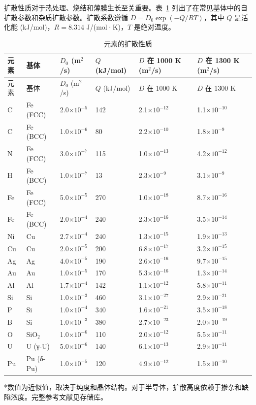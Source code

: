 \documentclass[12pt,a4paper]{article}
\begin{document}
	扩散性质对于热处理、烧结和薄膜生长至关重要。表~\ref{tab:diffusion-properties-func} 列出了在常见基体中的自扩散参数和杂质扩散参数。扩散系数遵循 \(D = D_0 \exp(-Q/RT)\)，其中 \(Q\) 是活化能 (kJ/mol)，\(R = 8.314\) J/(mol·K)，\(T\) 是绝对温度。
	
	\begin{longtable}{p{1.2cm}p{1.2cm}p{2.0cm}p{2.5cm}p{2.5cm}p{2.5cm}}
		\caption{元素的扩散性质} \label{tab:diffusion-properties-func} \\
		\toprule
		元素 & 基体 & \(D_0\) (m\(^2\)/s) & \(Q\) (kJ/mol) & \(D\) 在 1000 K (m\(^2\)/s) & \(D\) 在 1300 K (m\(^2\)/s) \\
		\midrule
		\endfirsthead
		\toprule
		元素 & 基体 & \(D_0\) (m\(^2\)/s) & \(Q\) (kJ/mol) & \(D\) 在 1000 K & \(D\) 在 1300 K \\
		\midrule
		\endhead
		C & Fe (FCC) & 2.0\(\times10^{-5}\) & 142 & 2.1\(\times10^{-12}\) & 1.1\(\times10^{-10}\) \\
		C & Fe (BCC) & 1.0\(\times10^{-6}\) & 80 & 2.2\(\times10^{-10}\) & 1.8\(\times10^{-9}\) \\
		N & Fe (FCC) & 3.0\(\times10^{-7}\) & 115 & 1.0\(\times10^{-13}\) & 4.2\(\times10^{-12}\) \\
		H & Fe (BCC) & 1.0\(\times10^{-7}\) & 13 & 2.3\(\times10^{-9}\) & 3.1\(\times10^{-9}\) \\
		Fe & Fe (FCC) & 5.0\(\times10^{-5}\) & 270 & 1.0\(\times10^{-18}\) & 8.7\(\times10^{-16}\) \\
		Fe & Fe (BCC) & 2.0\(\times10^{-4}\) & 240 & 2.3\(\times10^{-16}\) & 3.5\(\times10^{-14}\) \\
		Ni & Cu & 2.7\(\times10^{-4}\) & 240 & 1.3\(\times10^{-15}\) & 1.9\(\times10^{-13}\) \\
		Cu & Cu & 2.0\(\times10^{-5}\) & 200 & 6.8\(\times10^{-17}\) & 3.2\(\times10^{-15}\) \\
		Ag & Ag & 4.0\(\times10^{-5}\) & 190 & 2.6\(\times10^{-16}\) & 9.7\(\times10^{-15}\) \\
		Au & Au & 1.0\(\times10^{-5}\) & 170 & 5.3\(\times10^{-16}\) & 1.3\(\times10^{-14}\) \\
		Al & Al & 1.7\(\times10^{-4}\) & 142 & 1.1\(\times10^{-12}\) & 5.8\(\times10^{-11}\) \\
		Si & Si & 1.0\(\times10^{-3}\) & 460 & 3.1\(\times10^{-27}\) & 2.9\(\times10^{-21}\) \\
		P & Si & 1.0\(\times10^{-4}\) & 340 & 1.6\(\times10^{-21}\) & 3.5\(\times10^{-18}\) \\
		B & Si & 1.0\(\times10^{-3}\) & 380 & 2.7\(\times10^{-23}\) & 2.0\(\times10^{-19}\) \\
		O & SiO\(_2\) & 1.0\(\times10^{-6}\) & 110 & 2.0\(\times10^{-12}\) & 5.5\(\times10^{-11}\) \\
		U & U (γ-U) & 5.0\(\times10^{-6}\) & 140 & 6.1\(\times10^{-13}\) & 2.9\(\times10^{-11}\) \\
		Pu & Pu (δ-Pu) & 1.0\(\times10^{-5}\) & 120 & 4.9\(\times10^{-12}\) & 1.5\(\times10^{-10}\) \\
		\bottomrule
	\end{longtable}
	*数值为近似值，取决于纯度和晶体结构。对于半导体，扩散高度依赖于掺杂和缺陷浓度。完整参考文献见存储库。
	
\end{document}
